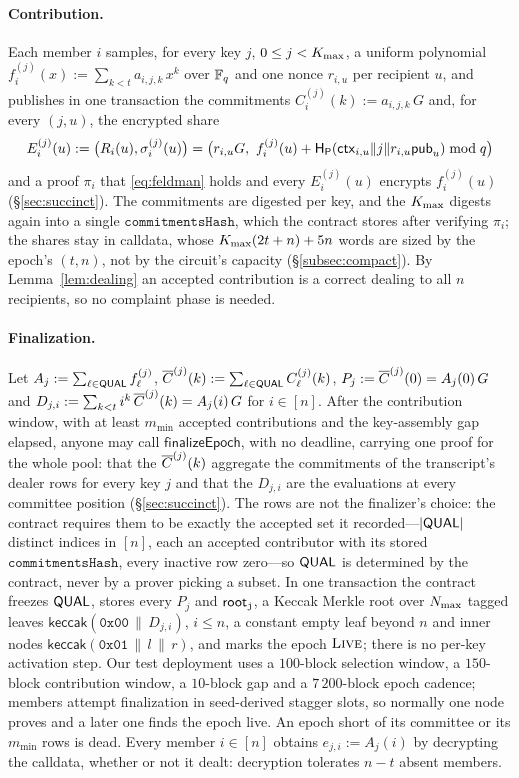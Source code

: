 \paragraph{Contribution.} Each member $i$ samples, for every key $j$, $0 \le j < K_{\max}$, a uniform polynomial $f_i^{(j)}(x) := \sum_{k<t} a_{i,j,k}\, x^k$ over $\mathbb{F}_q$ and one nonce $r_{i,u}$ per recipient $u$, and publishes in one transaction the commitments $C_i^{(j)}(k) := a_{i,j,k}\, G$ and, for every $(j, u)$, the encrypted share
\[
    E_i^{(j)}(u) := \big(R_i(u), \sigma_i^{(j)}(u)\big)
    = \big(r_{i,u} G,\ f_i^{(j)}(u) + \mathsf{H}_{\mathsf{P}}(\mathsf{ctx}_{i,u} \| j \| r_{i,u} \mathsf{pub}_u) \bmod q\big)
\]
and a proof $\pi_i$ that \eqref{eq:feldman} holds and every $E_i^{(j)}(u)$ encrypts $f_i^{(j)}(u)$ (\S\ref{sec:succinct}). The commitments are digested per key, and the $K_{\max}$ digests again into a single $\mathtt{commitmentsHash}$, which the contract stores after verifying $\pi_i$; the shares stay in calldata, whose $K_{\max}(2t+n) + 5n$ words are sized by the epoch's $(t, n)$, not by the circuit's capacity (\S\ref{subsec:compact}). By Lemma~\ref{lem:dealing} an accepted contribution is a correct dealing to all $n$ recipients, so no complaint phase \cite{pedersen1991threshold,gennaro1999secure} is needed.

\paragraph{Finalization.} Let $A_j := \sum_{\ell \in \mathsf{QUAL}} f_\ell^{(j)}$, $\overline{C}^{(j)}(k) := \sum_{\ell \in \mathsf{QUAL}} C_\ell^{(j)}(k)$, $P_j := \overline{C}^{(j)}(0) = A_j(0)\,G$ and $D_{j,i} := \sum_{k<t} i^k\, \overline{C}^{(j)}(k) = A_j(i)\,G$ for $i \in [n]$. After the contribution window, with at least $m_{\min}$ accepted contributions and the key-assembly gap elapsed, anyone may call $\mathsf{finalizeEpoch}$, with no deadline, carrying one proof for the whole pool: that the $\overline{C}^{(j)}(k)$ aggregate the commitments of the transcript's dealer rows for every key $j$ and that the $D_{j,i}$ are the evaluations at every committee position (\S\ref{sec:succinct}). The rows are not the finalizer's choice: the contract requires them to be exactly the accepted set it recorded---$|\mathsf{QUAL}|$ distinct indices in $[n]$, each an accepted contributor with its stored $\mathtt{commitmentsHash}$, every inactive row zero---so $\mathsf{QUAL}$ is determined by the contract, never by a prover picking a subset. In one transaction the contract freezes $\mathsf{QUAL}$, stores every $P_j$ and $\mathsf{root}_{\mathtt{j}}$, a Keccak Merkle root over $N_{\max}$ tagged leaves $\mathsf{keccak}(\mathtt{0x00} \,\|\, D_{j,i})$, $i \le n$, a constant empty leaf beyond $n$ and inner nodes $\mathsf{keccak}(\mathtt{0x01} \,\|\, l \,\|\, r)$, and marks the epoch $\textsc{Live}$; there is no per-key activation step. Our test deployment uses a $100$-block selection window, a $150$-block contribution window, a $10$-block gap and a $7\,200$-block epoch cadence; members attempt finalization in seed-derived stagger slots, so normally one node proves and a later one finds the epoch live. An epoch short of its committee or its $m_{\min}$ rows is dead. Every member $i \in [n]$ obtains $e_{j,i} := A_j(i)$ by decrypting the calldata, whether or not it dealt: decryption tolerates $n - t$ absent members.

